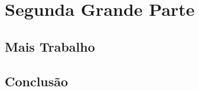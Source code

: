\part{Segunda Grande Parte}
	\chapter{Mais Trabalho}
		\lipsum
	\appendix
		\chapter{Conclusão}
			\lipsum